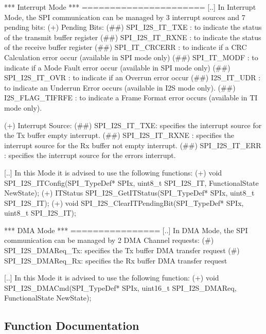 \begin{DoxyVerb}
 *** Interrupt Mode ***
 ======================
 [..] In Interrupt Mode, the SPI communication can be managed by 3 interrupt sources
      and 7 pending bits: 
   (+) Pending Bits:
       (##) SPI_I2S_IT_TXE : to indicate the status of the transmit buffer register
       (##) SPI_I2S_IT_RXNE : to indicate the status of the receive buffer register
       (##) SPI_IT_CRCERR : to indicate if a CRC Calculation error occur (available in SPI mode only)            
       (##) SPI_IT_MODF : to indicate if a Mode Fault error occur (available in SPI mode only)
       (##) SPI_I2S_IT_OVR : to indicate if an Overrun error occur
       (##) I2S_IT_UDR : to indicate an Underrun Error occurs (available in I2S mode only).
       (##) I2S_FLAG_TIFRFE : to indicate a Frame Format error occurs (available in TI mode only).

   (+) Interrupt Source:
       (##) SPI_I2S_IT_TXE: specifies the interrupt source for the Tx buffer empty 
            interrupt.  
       (##) SPI_I2S_IT_RXNE : specifies the interrupt source for the Rx buffer not 
            empty interrupt.
       (##) SPI_I2S_IT_ERR : specifies the interrupt source for the errors interrupt.

 [..] In this Mode it is advised to use the following functions:
   (+) void SPI_I2S_ITConfig(SPI_TypeDef* SPIx, uint8_t SPI_I2S_IT, FunctionalState NewState);
   (+) ITStatus SPI_I2S_GetITStatus(SPI_TypeDef* SPIx, uint8_t SPI_I2S_IT);
   (+) void SPI_I2S_ClearITPendingBit(SPI_TypeDef* SPIx, uint8_t SPI_I2S_IT);

 *** DMA Mode ***
 ================
 [..] In DMA Mode, the SPI communication can be managed by 2 DMA Channel requests:
   (#) SPI_I2S_DMAReq_Tx: specifies the Tx buffer DMA transfer request
   (#) SPI_I2S_DMAReq_Rx: specifies the Rx buffer DMA transfer request

 [..] In this Mode it is advised to use the following function:
   (+) void SPI_I2S_DMACmd(SPI_TypeDef* SPIx, uint16_t SPI_I2S_DMAReq, FunctionalState 
       NewState);\end{DoxyVerb}
 

\subsection{Function Documentation}
\mbox{\label{group___s_p_i___group5_ga3aabd9e2437e213056c0ed9bdfa1a724}} 
